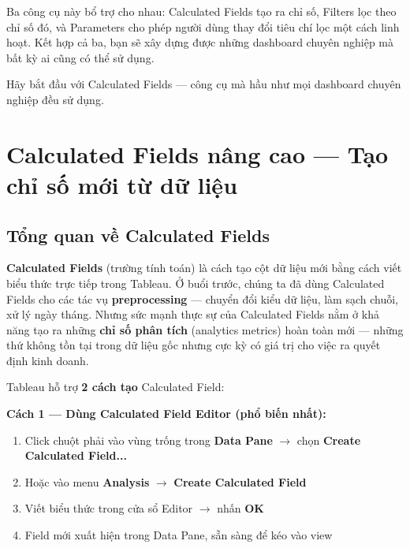 \documentclass[12pt]{article}
\begin{document}
\noindent Ba công cụ này bổ trợ cho nhau: Calculated Fields tạo ra chỉ số, Filters lọc theo chỉ số đó, và Parameters cho phép người dùng thay đổi tiêu chí lọc một cách linh hoạt. Kết hợp cả ba, bạn sẽ xây dựng được những dashboard chuyên nghiệp mà bất kỳ ai cũng có thể sử dụng.

\noindent Hãy bắt đầu với Calculated Fields --- công cụ mà hầu như mọi dashboard chuyên nghiệp đều sử dụng.

\newpage
\setcounter{tocdepth}{2}
\tableofcontents
\thispagestyle{fancy}

\newpage
\section{Calculated Fields nâng cao --- Tạo chỉ số mới từ dữ liệu}
\label{section:calculated-fields}

\subsection{Tổng quan về Calculated Fields}

\noindent \textbf{Calculated Fields} (trường tính toán) là cách tạo cột dữ liệu mới bằng cách viết biểu thức trực tiếp trong Tableau. Ở buổi trước, chúng ta đã dùng Calculated Fields cho các tác vụ \textbf{preprocessing} --- chuyển đổi kiểu dữ liệu, làm sạch chuỗi, xử lý ngày tháng. Nhưng sức mạnh thực sự của Calculated Fields nằm ở khả năng tạo ra những \textbf{chỉ số phân tích} (analytics metrics) hoàn toàn mới --- những thứ không tồn tại trong dữ liệu gốc nhưng cực kỳ có giá trị cho việc ra quyết định kinh doanh.

\noindent Tableau hỗ trợ \textbf{2 cách tạo} Calculated Field:

\noindent \textbf{Cách 1 --- Dùng Calculated Field Editor (phổ biến nhất):}

\begin{enumerate}[nosep]
    \item Click chuột phải vào vùng trống trong \textbf{Data Pane} $\rightarrow$ chọn \textbf{Create Calculated Field...}
    \item Hoặc vào menu \textbf{Analysis} $\rightarrow$ \textbf{Create Calculated Field}
    \item Viết biểu thức trong cửa sổ Editor $\rightarrow$ nhấn \textbf{OK}
    \item Field mới xuất hiện trong Data Pane, sẵn sàng để kéo vào view
\end{enumerate}
\end{document}
